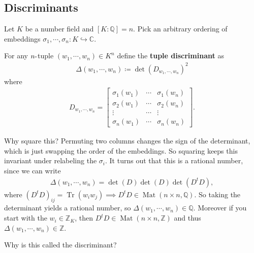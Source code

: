 \hypertarget{discriminants}{%
\subsection{Discriminants}\label{discriminants}}

\begin{remark}

Let \(K\) be a number field and \([K : {\mathbb{Q}}] = n\). Pick an
arbitrary ordering of embeddings
\(\sigma_1, \cdots, \sigma_n: K \hookrightarrow{\mathbb{C}}\).

\end{remark}

\begin{definition}

For any \(n{\hbox{-}}\)tuple \((w_1, \cdots, w_n) \in K^n\) define the
\textbf{tuple discriminant} as
\begin{align*}
\Delta(w_1, \cdots, w_n) \coloneqq\det( D_{w_1, \cdots, w_n} )^2 
\end{align*}
where
\begin{align*}
D_{w_1, \cdots, w_n}
=
\begin{bmatrix}
\sigma_1(w_1) & \cdots  & \sigma_1(w_n) \\
\sigma_2(w_1) & \cdots  & \sigma_2(w_n) \\
\vdots & \cdots & \vdots \\
\sigma_n(w_1) & \cdots  & \sigma_n(w_n) 
\end{bmatrix}
.\end{align*}

\end{definition}

\begin{remark}

Why square this? Permuting two columns changes the sign of the
determinant, which is just swapping the order of the embeddings. So
squaring keeps this invariant under relabeling the \(\sigma_i\). It
turns out that this is a rational number, since we can write
\begin{align*}
\Delta(w_1, \cdots, w_n) 
= \det(D) \det(D) 
\det(D^t D)
,\end{align*}
where
\((D^t D)_{ij} = \operatorname{Tr}(w_i w_j) \implies D^t D \in \operatorname{Mat}(n\times n, {\mathbb{Q}})\).
So taking the determinant yields a rational number, so
\(\Delta(w_1, \cdots, w_n) \in {\mathbb{Q}}\). Moreover if you start
with the \(w_i \in {\mathbb{Z}}_K\), then
\(D^t D \in \operatorname{Mat}(n\times n, {\mathbb{Z}})\) and thus
\(\Delta(w_1, \cdots, w_n) \in {\mathbb{Z}}\).

Why is this called the discriminant?

\end{remark}

